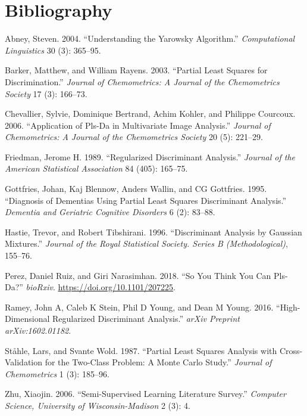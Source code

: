 \documentclass[conference,final,]{IEEEtran}
\begin{document}
\hypertarget{bibliography}{%
\section*{Bibliography}\label{bibliography}}

\hypertarget{refs}{}
\leavevmode\hypertarget{ref-abney2004understanding}{}%
Abney, Steven. 2004. ``Understanding the Yarowsky Algorithm.''
\emph{Computational Linguistics} 30 (3): 365--95.

\leavevmode\hypertarget{ref-barker2003partial}{}%
Barker, Matthew, and William Rayens. 2003. ``Partial Least Squares for
Discrimination.'' \emph{Journal of Chemometrics: A Journal of the
Chemometrics Society} 17 (3): 166--73.

\leavevmode\hypertarget{ref-chevallier2006application}{}%
Chevallier, Sylvie, Dominique Bertrand, Achim Kohler, and Philippe
Courcoux. 2006. ``Application of Pls-Da in Multivariate Image
Analysis.'' \emph{Journal of Chemometrics: A Journal of the Chemometrics
Society} 20 (5): 221--29.

\leavevmode\hypertarget{ref-friedman1989regularized}{}%
Friedman, Jerome H. 1989. ``Regularized Discriminant Analysis.''
\emph{Journal of the American Statistical Association} 84 (405):
165--75.

\leavevmode\hypertarget{ref-gottfries1995diagnosis}{}%
Gottfries, Johan, Kaj Blennow, Anders Wallin, and CG Gottfries. 1995.
``Diagnosis of Dementias Using Partial Least Squares Discriminant
Analysis.'' \emph{Dementia and Geriatric Cognitive Disorders} 6 (2):
83--88.

\leavevmode\hypertarget{ref-hastie1996discriminant}{}%
Hastie, Trevor, and Robert Tibshirani. 1996. ``Discriminant Analysis by
Gaussian Mixtures.'' \emph{Journal of the Royal Statistical Society.
Series B (Methodological)}, 155--76.

\leavevmode\hypertarget{ref-Perez207225}{}%
Perez, Daniel Ruiz, and Giri Narasimhan. 2018. ``So You Think You Can
Pls-Da?'' \emph{bioRxiv}. \url{https://doi.org/10.1101/207225}.

\leavevmode\hypertarget{ref-ramey2016high}{}%
Ramey, John A, Caleb K Stein, Phil D Young, and Dean M Young. 2016.
``High-Dimensional Regularized Discriminant Analysis.'' \emph{arXiv
Preprint arXiv:1602.01182}.

\leavevmode\hypertarget{ref-staahle1987partial}{}%
Ståhle, Lars, and Svante Wold. 1987. ``Partial Least Squares Analysis
with Cross-Validation for the Two-Class Problem: A Monte Carlo Study.''
\emph{Journal of Chemometrics} 1 (3): 185--96.

\leavevmode\hypertarget{ref-zhu2006semi}{}%
Zhu, Xiaojin. 2006. ``Semi-Supervised Learning Literature Survey.''
\emph{Computer Science, University of Wisconsin-Madison} 2 (3): 4.
\end{document}
